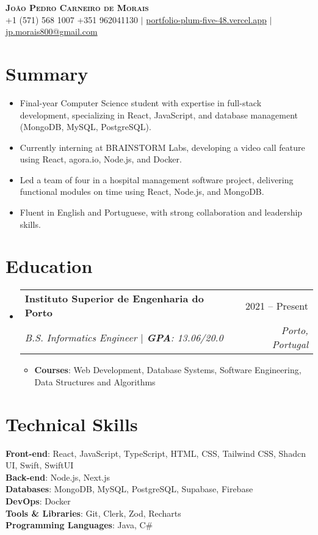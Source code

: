 \documentclass[letterpaper,11pt]{article}
\makeatletter
\newcommand{\resumeItem}[1]{\item\small{#1 \vspace{-2pt}}}
\newcommand{\resumeSubheading}[4]{
  \vspace{-2pt}\item
    \begin{tabular*}{0.97\textwidth}[t]{l@{\extracolsep{\fill}}r}
      \textbf{#1} & #2 \\
      \textit{\small#3} & \textit{\small #4} \\
    \end{tabular*}\vspace{-7pt}
}
\newcommand{\resumeSubHeadingListStart}{\begin{itemize}[leftmargin=0.15in, label={}]}
\newcommand{\resumeSubHeadingListEnd}{\end{itemize}}
\newcommand{\resumeItemListStart}{\begin{itemize}}
\newcommand{\resumeItemListEnd}{\end{itemize}\vspace{-5pt}}
\makeatother
\begin{document}
\begin{center}
    \textbf{\Huge \scshape João Pedro Carneiro de Morais} \\ \vspace{1pt}
    \small +1 (571) 568 1007  +351 962041130 $|$ \href{https://portfolio-plum-five-48.vercel.app/}{portfolio-plum-five-48.vercel.app} $|$ \href{mailto:jp.morais800@gmail.com}{jp.morais800@gmail.com}
\end{center}

\section{Summary}
  \resumeItemListStart
    \resumeItem{Final-year Computer Science student with expertise in full-stack development, specializing in React, JavaScript, and database management (MongoDB, MySQL, PostgreSQL).}
    \resumeItem{Currently interning at BRAINSTORM Labs, developing a video call feature using React, agora.io, Node.js, and Docker.}
    \resumeItem{Led a team of four in a hospital management software project, delivering functional modules on time using React, Node.js, and MongoDB.}
    \resumeItem{Fluent in English and Portuguese, with strong collaboration and leadership skills.}
  \resumeItemListEnd

\section{Education}
  \resumeSubHeadingListStart
    \resumeSubheading
      {Instituto Superior de Engenharia do Porto}{2021 -- Present}
      {B.S. Informatics Engineer $|$ \textbf{GPA}: 13.06/20.0}
      {Porto, Portugal}
      \resumeItemListStart
        \resumeItem{\textbf{Courses}: Web Development, Database Systems, Software Engineering, Data Structures and Algorithms}
      \resumeItemListEnd
  \resumeSubHeadingListEnd

\section{Technical Skills}
 \begin{itemize}[leftmargin=0.15in, label={}]
    \small{\item{
    {\textbf{Front-end}: React, JavaScript, TypeScript, HTML, CSS, Tailwind CSS, Shadcn UI, Swift, SwiftUI}\\
    {\textbf{Back-end}: Node.js, Next.js}\\
    {\textbf{Databases}: MongoDB, MySQL, PostgreSQL, Supabase, Firebase}\\
    {\textbf{DevOps}: Docker}\\
    {\textbf{Tools \& Libraries}: Git, Clerk, Zod, Recharts}\\
    {\textbf{Programming Languages}: Java, C\#}}}
\end{itemize}
\end{document}
